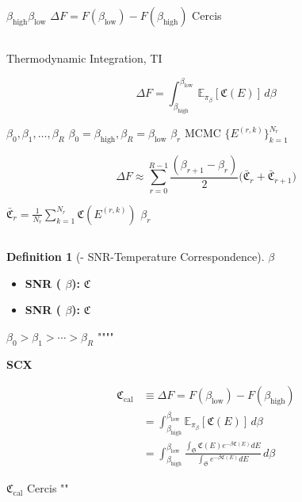 \documentclass[12pt,a4paper]{article}
\theoremstyle{plain}
\theoremstyle{definition}
\newtheorem{definition}[theorem]{ Definition}
\newcommand{\E}{\mathbb{E}}
\newcommand{\Situs}{\mathfrak{S}}
\newcommand{\Cercis}{\mathfrak{C}}
\begin{document}
$\beta_{\text{high}}$$\beta_{\text{low}}$
\textbf{} $\Delta F = F(\beta_{\text{low}}) - F(\beta_{\text{high}})$
 Cercis 

\subsection{}

Thermodynamic Integration, TI

\begin{equation}\label{eq:ti}
    \Delta F = \int_{\beta_{\text{high}}}^{\beta_{\text{low}}} \E_{\pi_\beta}[\Cercis(E)] \, d\beta
\end{equation}

 $\beta_0, \beta_1, \ldots, \beta_R$ 
$\beta_0 = \beta_{\text{high}}, \beta_R = \beta_{\text{low}}$
$\beta_r$  MCMC  $\{E^{(r,k)}\}_{k=1}^{N_r}$

\begin{equation}\label{eq:ti_discrete}
    \Delta F \approx \sum_{r=0}^{R-1} \frac{(\beta_{r+1} - \beta_r)}{2}
    \Big( \bar{\Cercis}_r + \bar{\Cercis}_{r+1} \Big)
\end{equation}

 $\bar{\Cercis}_r = \frac{1}{N_r} \sum_{k=1}^{N_r} \Cercis(E^{(r,k)})$ 
 $\beta_r$ 

\subsection{}

\begin{definition}[- SNR-Temperature Correspondence]
 $\beta$ 

\begin{itemize}
    \item \textbf{ SNR ( $\beta$):} $\Cercis$ 
        
    \item \textbf{ SNR ( $\beta$):} $\Cercis$ 
        
\end{itemize}

 $\beta_0 > \beta_1 > \cdots > \beta_R$ """"

\end{definition}

\begin{keyeq}
\textbf{SCX }

\begin{align}
    \Cercis_{\text{cal}} &\equiv \Delta F = F(\beta_{\text{low}}) - F(\beta_{\text{high}})
        \label{eq:cercis_cal} \\
    &= \int_{\beta_{\text{high}}}^{\beta_{\text{low}}} \E_{\pi_\beta}[\Cercis(E)] \, d\beta
        \label{eq:cercis_ti} \\
    &= \int_{\beta_{\text{high}}}^{\beta_{\text{low}}} \frac{\int_{\Situs} \Cercis(E) e^{-\beta \Cercis(E)} dE}
        {\int_{\Situs} e^{-\beta \Cercis(E)} dE} \, d\beta \label{eq:cercis_explicit}
\end{align}

$\Cercis_{\text{cal}}$  Cercis ""
\end{keyeq}
\end{document}
